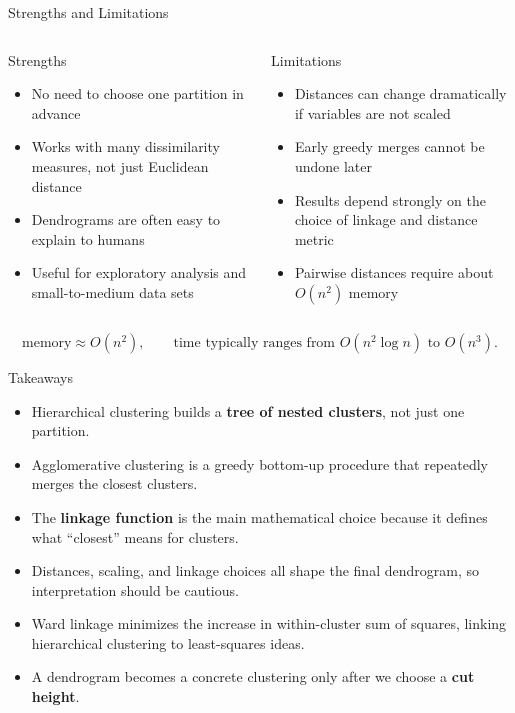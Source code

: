 \documentclass[aspectratio=169,11pt]{beamer}
\begin{document}
\begin{frame}[t]{Strengths and Limitations}
  \begin{columns}[T,totalwidth=\textwidth]
      \begin{block}{Strengths}
        \begin{itemize}
          \item No need to choose one partition in advance
          \item Works with many dissimilarity measures, not just Euclidean distance
          \item Dendrograms are often easy to explain to humans
          \item Useful for exploratory analysis and small-to-medium data sets
        \end{itemize}
      \end{block}
      \begin{block}{Limitations}
        \begin{itemize}
          \item Distances can change dramatically if variables are not scaled
          \item Early greedy merges cannot be undone later
          \item Results depend strongly on the choice of linkage and distance metric
          \item Pairwise distances require about $O(n^2)$ memory
        \end{itemize}
      \end{block}
  \end{columns}

  \vspace{0.2em}
  \[
    \text{memory} \approx O(n^2),
    \qquad
    \text{time typically ranges from } O(n^2\log n) \text{ to } O(n^3).
  \]
\end{frame}

\begin{frame}[t]{Takeaways}
  \begin{itemize}
    \item Hierarchical clustering builds a \textbf{tree of nested clusters}, not just one partition.
    \item Agglomerative clustering is a greedy bottom-up procedure that repeatedly merges the closest clusters.
    \item The \textbf{linkage function} is the main mathematical choice because it defines what ``closest'' means for clusters.
    \item Distances, scaling, and linkage choices all shape the final dendrogram, so interpretation should be cautious.
    \item Ward linkage minimizes the increase in within-cluster sum of squares, linking hierarchical clustering to least-squares ideas.
    \item A dendrogram becomes a concrete clustering only after we choose a \textbf{cut height}.
  \end{itemize}
\end{frame}
\end{document}
